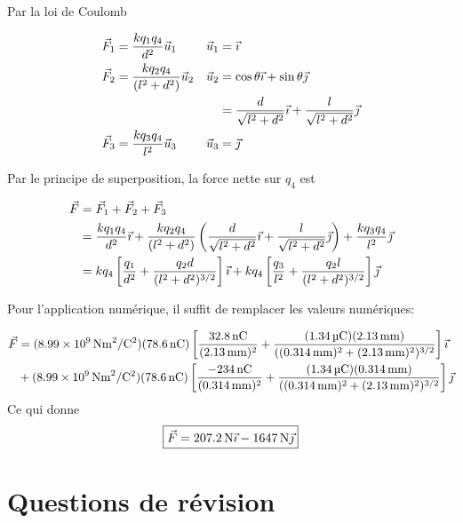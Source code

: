   Par la loi de Coulomb

  \begin{align*}
    \vec{F}_1 &= \frac{kq_1q_4}{d^2}\vec{u}_1 & \vec{u}_1 &= \vec{\imath} \\
    \vec{F}_2 &= \frac{kq_2q_4}{(l^2 + d^2)}\vec{u}_2 & \vec{u}_2 &= \cos\theta \vec{\imath} +
             \sin\theta \vec{\jmath} \\
    & & &= \frac{d}{\sqrt{l^2 + d^2}} \vec{\imath} + \frac{l}{\sqrt{l^2 + d^2}} \vec{\jmath} \\
    \vec{F}_3 &= \frac{kq_3q_4}{l^2}\vec{u}_3 & \vec{u}_3 &= \vec{\jmath} \\
  \end{align*}

  Par le principe de superposition, la force nette sur $q_4$ est

  \begin{align*}
    \vec{F} &= \vec{F}_1 + \vec{F}_2 + \vec{F}_3 \\
        &= \frac{kq_1q_4}{d^2}\vec{\imath} +
           \frac{kq_2q_4}{(l^2 + d^2)} \left( \frac{d}{\sqrt{l^2 + d^2}} \vec{\imath} + \frac{l}{\sqrt{l^2 + d^2}} \vec{\jmath} \right) +
           \frac{kq_3q_4}{l^2}\vec{\jmath} \\
        &= kq_4\left[ \frac{q_1}{d^2} + \frac{q_2 d}{(l^2 + d^2)^{3/2}} \right] \vec{\imath}
         + kq_4\left[ \frac{q_3}{l^2} + \frac{q_2 l}{(l^2 + d^2)^{3/2}} \right] \vec{\jmath}
  \end{align*}

  Pour l'application numérique, il suffit de remplacer les valeurs numériques:

  \begin{align*}
    \vec{F} &= (\SI{8.99e9}{Nm^2/C^2}) (\SI{78.6}{nC})
          \left[ \frac{\SI{32.8}{nC}}{(\SI{2.13}{mm})^2} +
            \frac{(\SI{1.34}{\micro\coulomb}) (\SI{2.13}{mm})}{((\SI{0.314}{mm})^2
              + (\SI{2.13}{mm})^2)^{3/2}} \right] \vec{\imath} \\
        &{} + (\SI{8.99e9}{Nm^2/C^2}) (\SI{78.6}{nC})
          \left[ \frac{\SI{-234}{\nano C}}{(\SI{0.314}{mm})^2} +
            \frac{(\SI{1.34}{\micro\coulomb}) (\SI{0.314}{mm})}{((\SI{0.314}{mm})^2
              + (\SI{2.13}{mm})^2)^{3/2}} \right] \vec{\jmath}
  \end{align*}
  Ce qui donne
  \[
    \boxed{\vec{F} = \SI{207.2}{N}\vec{\imath} - \SI{1647}{N}\vec{\jmath}}
  \]



\sectionline

\section{Questions de révision}


